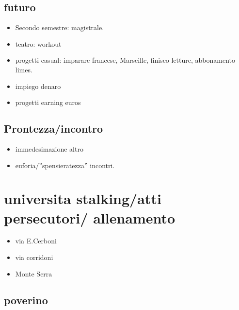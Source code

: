 \subsection{futuro}

\begin{itemize}

\item Secondo semestre: magistrale.

\item teatro: workout

\item progetti casual: imparare francese, Marseille, finisco letture, abbonamento limes.

\item impiego denaro

\item progetti earning euros

\end{itemize}

\subsection{Prontezza/incontro}

\begin{itemize}

\item immedesimazione altro

\item euforia/''spensieratezza'' incontri.

\end{itemize}

\section{universita stalking/atti persecutori/ allenamento}

\begin{itemize}

\item via E.Cerboni

\item via corridoni

\item Monte Serra

\end{itemize}


\subsection{poverino}

